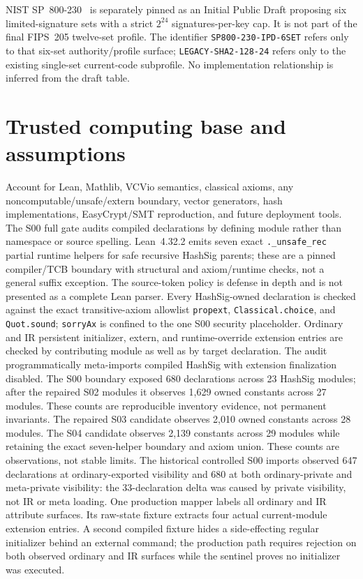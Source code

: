 \documentclass[11pt]{article}
\begin{document}
NIST SP~800-230~\cite{sp800230ipd} is separately pinned as an Initial Public Draft proposing six
limited-signature sets with a strict \(2^{24}\) signatures-per-key cap. It is not part of the final
FIPS~205 twelve-set profile. The identifier \texttt{SP800-230-IPD-6SET} refers only to that six-set
authority/profile surface; \texttt{LEGACY-SHA2-128-24} refers only to the existing single-set
current-code subprofile. No implementation relationship is inferred from the draft table.

\section{Trusted computing base and assumptions}
Account for Lean, Mathlib, VCVio semantics, classical axioms, any noncomputable/unsafe/extern boundary,
vector generators, hash implementations, EasyCrypt/SMT reproduction, and future deployment tools.
The S00 full gate audits compiled declarations by defining module rather than namespace or source
spelling. Lean~4.32.2 emits seven exact \texttt{.\_unsafe\_rec} partial runtime helpers for safe
recursive HashSig parents; these are a pinned compiler/TCB boundary with structural and axiom/runtime
checks, not a general suffix exception. The source-token policy is defense in depth and is not
presented as a complete Lean parser. Every HashSig-owned declaration is checked against the exact
transitive-axiom allowlist \texttt{propext}, \texttt{Classical.choice}, and \texttt{Quot.sound};
\texttt{sorryAx} is confined to the one S00 security placeholder. Ordinary and IR persistent
initializer, extern, and runtime-override extension entries are checked by contributing module as
well as by target declaration. The audit programmatically meta-imports compiled HashSig with
extension finalization disabled. The S00 boundary exposed 680 declarations across 23 HashSig
modules; after the repaired S02 modules it observes 1,629 owned constants across 27 modules. These
counts are reproducible inventory evidence, not permanent invariants. The repaired S03 candidate observes
2,010 owned constants across 28 modules. The S04 candidate observes 2,139 constants across 29
modules while retaining the exact seven-helper boundary and axiom union. These counts are
observations, not stable limits. The historical controlled
S00 imports observed 647 declarations at ordinary-exported visibility and 680 at both
ordinary-private and meta-private visibility: the 33-declaration delta was caused by private
visibility, not IR or meta loading. One
production mapper labels all ordinary and IR attribute surfaces. Its raw-state fixture extracts four actual current-module
extension entries. A second compiled fixture hides a side-effecting regular initializer behind an
external command; the production path requires rejection on both observed ordinary and IR surfaces
while the sentinel proves no initializer was executed.
\end{document}
